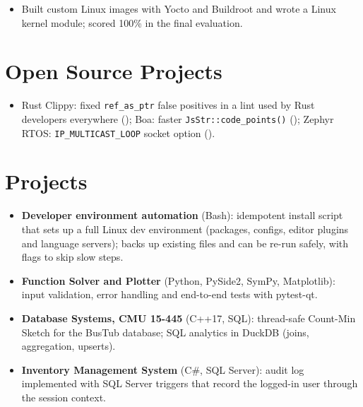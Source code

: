 \documentclass[10pt]{article}
\begin{document}
\begin{itemize}
  \item Built custom Linux images with Yocto and Buildroot and wrote a Linux kernel module; scored 100\% in the final evaluation.
\end{itemize}

\section*{Open Source Projects}
\begin{itemize}
  \item Rust Clippy: fixed \texttt{ref\_as\_ptr} false positives in a lint used by Rust developers everywhere (); Boa: faster \texttt{JsStr::code\_points()} (); Zephyr RTOS: \texttt{IP\_MULTICAST\_LOOP} socket option ().
\end{itemize}

\section*{Projects}
\begin{itemize}
  \item \textbf{Developer environment automation} (Bash): idempotent install script that sets up a full Linux dev environment (packages, configs, editor plugins and language servers); backs up existing files and can be re-run safely, with flags to skip slow steps. 
  \item \textbf{Function Solver and Plotter} (Python, PySide2, SymPy, Matplotlib): input validation, error handling and end-to-end tests with pytest-qt. 
  \item \textbf{Database Systems, CMU 15-445} (C++17, SQL): thread-safe Count-Min Sketch for the BusTub database; SQL analytics in DuckDB (joins, aggregation, upserts). 
  \item \textbf{Inventory Management System} (C\#, SQL Server): audit log implemented with SQL Server triggers that record the logged-in user through the session context. 
\end{itemize}
\end{document}
